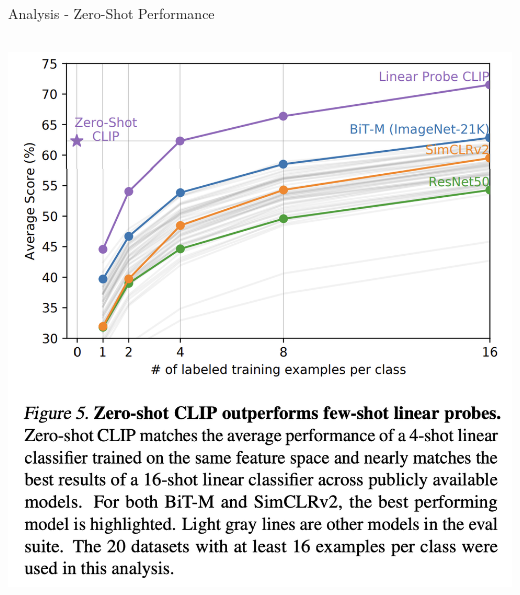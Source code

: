 \documentclass[aspectratio=169,xcolor=dvipsnames]{beamer}
\begin{document}

\begin{frame}{Analysis - Zero-Shot Performance}
\begin{columns}
    \begin{column}{0.45\textwidth}
    \includegraphics[width=\textwidth]{figures/few_shot_comparison.png}
    \end{column}


\end{columns}
\end{frame}
\end{document}
